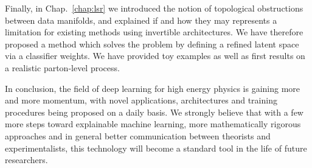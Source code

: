 \medskip

Finally, in Chap.~\ref{chap:lsr} we introduced the notion of topological obstructions between data manifolds, and explained if and how they may represents a limitation for existing methods using invertible architectures. We have therefore proposed a method which solves the problem by defining a refined latent space via a classifier weights. We have provided toy examples as well as first results on a realistic parton-level process.

\medskip

In conclusion, the field of deep learning for high energy physics is gaining more and more momentum, with novel applications, architectures and training procedures being proposed on a daily basis. We strongly believe that with a few more steps toward explainable machine learning, more mathematically rigorous approaches and in general better communication between theorists and experimentalists, this technology will become a standard tool in the life of future researchers.
